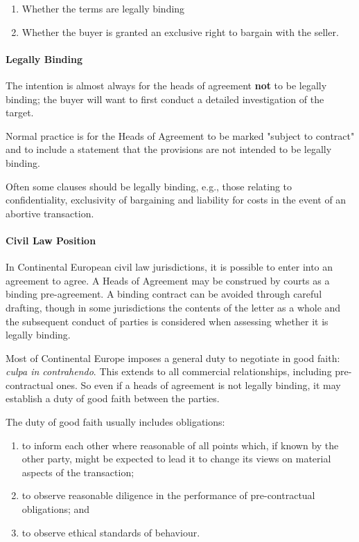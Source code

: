 \documentclass[
]{article}
\providecommand{\tightlist}{%
  \setlength{\itemsep}{0pt}\setlength{\parskip}{0pt}}
\begin{document}
\begin{enumerate}
\tightlist
\item
  Whether the terms are legally binding
\item
  Whether the buyer is granted an exclusive right to bargain with the
  seller.
\end{enumerate}

\hypertarget{legally-binding}{%
\paragraph{Legally Binding}\label{legally-binding}}

The intention is almost always for the heads of agreement \textbf{not}
to be legally binding; the buyer will want to first conduct a detailed
investigation of the target.

Normal practice is for the Heads of Agreement to be marked "subject to
contract" and to include a statement that the provisions are not
intended to be legally binding.

Often some clauses should be legally binding, e.g., those relating to
confidentiality, exclusivity of bargaining and liability for costs in
the event of an abortive transaction.

\hypertarget{civil-law-position}{%
\paragraph{Civil Law Position}\label{civil-law-position}}

In Continental European civil law jurisdictions, it is possible to enter
into an agreement to agree. A Heads of Agreement may be construed by
courts as a binding pre-agreement. A binding contract can be avoided
through careful drafting, though in some jurisdictions the contents of
the letter as a whole and the subsequent conduct of parties is
considered when assessing whether it is legally binding.

Most of Continental Europe imposes a general duty to negotiate in good
faith: \emph{culpa in contrahendo}. This extends to all commercial
relationships, including pre-contractual ones. So even if a heads of
agreement is not legally binding, it may establish a duty of good faith
between the parties.

The duty of good faith usually includes obligations:

\begin{enumerate}
\tightlist
\item
  to inform each other where reasonable of all points which, if known by
  the other party, might be expected to lead it to change its views on
  material aspects of the transaction;
\item
  to observe reasonable diligence in the performance of pre-contractual
  obligations; and
\item
  to observe ethical standards of behaviour.
\end{enumerate}
\end{document}
